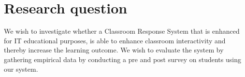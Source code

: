 \section{Research question}
We wish to investigate whether a Classroom Response System that is enhanced for IT educational purposes, is able to enhance classroom interactivity and thereby increase the learning outcome. 
We wish to evaluate the system by gathering empirical data by conducting a pre and post survey on students using our system.